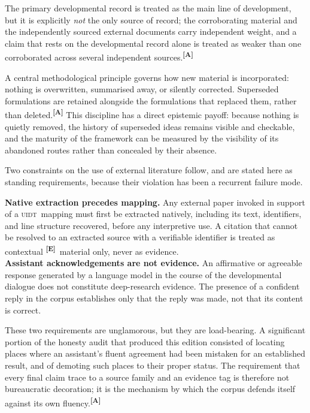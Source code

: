 \documentclass[12pt,a4paper,twoside]{article}
\theoremstyle{plain}
\theoremstyle{definition}
\theoremstyle{remark}
\newcommand{\UIDT}{\textsc{uidt}}
\newcommand{\catmark}[1]{\textsuperscript{\textsf{\textbf{[#1]}}}}
\begin{document}
The primary developmental record is treated as the main line of development, but it is explicitly \emph{not} the only source of record; the corroborating material and the independently sourced external documents carry independent weight, and a claim that rests on the developmental record alone is treated as weaker than one corroborated across several independent sources.\catmark{A}

A central methodological principle governs how new material is incorporated: nothing is overwritten, summarised away, or silently corrected. Superseded formulations are retained alongside the formulations that replaced them, rather than deleted.\catmark{A} This discipline has a direct epistemic payoff: because nothing is quietly removed, the history of superseded ideas remains visible and checkable, and the maturity of the framework can be measured by the visibility of its abandoned routes rather than concealed by their absence.

Two constraints on the use of external literature follow, and are stated here as standing requirements, because their violation has been a recurrent failure mode.
\newpage
\begin{governancebox}
\textbf{Native extraction precedes mapping.} Any external paper invoked in support of a \UIDT\ mapping must first be extracted natively, including its text, identifiers, and line structure recovered, before any interpretive use. A citation that cannot be resolved to an extracted source with a verifiable identifier is treated as contextual \catmark{E}\ material only, never as
evidence.\\[0.4em]
\textbf{Assistant acknowledgements are not evidence.} An affirmative or agreeable response generated by a language model in the course of the developmental dialogue does not constitute deep-research evidence. The presence of a confident reply in the corpus establishes only that the reply was made, not that its content is correct.
\end{governancebox}

\noindent These two requirements are unglamorous, but they are load-bearing. A significant portion of the honesty audit that produced this edition consisted of locating places where an assistant's fluent agreement had been mistaken for an established result, and of demoting such places to their proper status. The requirement that every final claim trace to a source family and an evidence tag is therefore not bureaucratic decoration; it is the mechanism by which the corpus defends itself against its own fluency.\catmark{A}
\end{document}
